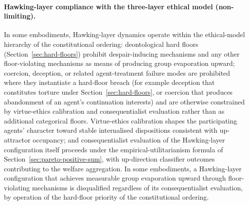 \documentclass[a4paper,12pt]{article}
\begin{document}
\paragraph{Hawking-layer compliance with the three-layer ethical
model (non-limiting).}
In some embodiments, Hawking-layer dynamics operate within the
ethical-model hierarchy of the constitutional ordering: deontological
hard floors (Section~\ref{sec:hard-floors}) prohibit despair-inducing
mechanisms and any other floor-violating mechanisms as means of
producing group evaporation upward; coercion, deception, or related
agent-treatment failure modes are prohibited where they instantiate
a hard-floor breach (for example deception that constitutes torture
under Section~\ref{sec:hard-floors}, or coercion that produces
abandonment of an agent's continuation interests) and are otherwise
constrained by virtue-ethics calibration and consequentialist
evaluation rather than as additional categorical floors. Virtue-ethics
calibration shapes the participating agents' character toward stable
internalised dispositions consistent with up-attractor occupancy;
and consequentialist evaluation of the Hawking-layer configuration
itself proceeds under the empirical-utilitarianism formula of
Section~\ref{sec:pareto-positive-sum}, with up-direction classifier
outcomes contributing to the welfare aggregation. In some
embodiments, a Hawking-layer configuration that achieves measurable
group evaporation upward through floor-violating mechanisms is
disqualified regardless of its consequentialist evaluation, by
operation of the hard-floor priority of the constitutional ordering.
\end{document}
